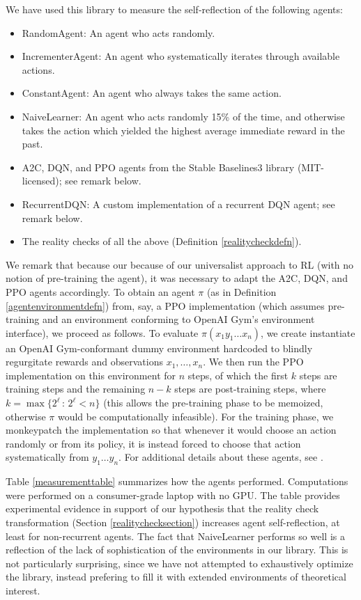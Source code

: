 \documentclass{article}
\begin{document}
We have used this library to measure the self-reflection of the following agents:
\begin{itemize}
  \item RandomAgent: An agent who acts randomly.
  \item IncrementerAgent: An agent who systematically iterates through available
    actions.
  \item ConstantAgent: An agent who always takes the same action.
  \item NaiveLearner: An agent who acts randomly 15\% of the time, and otherwise
    takes the action which yielded the highest average immediate reward in the past.
  \item A2C, DQN, and PPO agents from the Stable Baselines3 library
    \cite{stable-baselines3} (MIT-licensed); see remark below.
  \item RecurrentDQN: A custom implementation of a recurrent DQN agent; see remark below.
  \item The reality checks of all the above (Definition \ref{realitycheckdefn}).
\end{itemize}
We remark that because our because of our universalist approach to RL (with no notion of
pre-training the agent), it was necessary to adapt the A2C, DQN, and PPO agents accordingly.
To obtain an agent $\pi$ (as in Definition \ref{agentenvironmentdefn}) from,
say, a PPO implementation (which assumes pre-training and an environment conforming to
OpenAI Gym's environment interface),
we proceed as follows. To evaluate
$\pi(x_1y_1\ldots x_n)$, we create instantiate an OpenAI Gym-conformant dummy environment
hardcoded to blindly regurgitate rewards and observations $x_1,\ldots,x_n$.
We then run the PPO implementation on this environment for $n$ steps, of which the first
$k$ steps are training steps and the remaining $n-k$ steps are post-training steps,
where $k=\max\{2^\ell\,:\,2^\ell<n\}$
(this allows the pre-training phase to be memoized, otherwise $\pi$ would be
computationally infeasible). For the training phase, we monkeypatch the implementation
so that whenever it would choose an action randomly or from its policy, it is instead
forced to choose that action systematically from $y_1\ldots y_n$.
For additional details about these agents, see \cite{library}.

Table \ref{measurementtable} summarizes how the agents performed.
Computations were performed on a consumer-grade laptop with no GPU.
The table provides
experimental evidence in support of our hypothesis that the reality check transformation
(Section \ref{realitychecksection}) increases agent self-reflection, at least for
non-recurrent agents. The fact that NaiveLearner performs so well is a reflection of the
lack of sophistication of the environments in our library. This is not particularly
surprising, since we have not attempted to exhaustively optimize the library, instead
prefering to fill it with extended environments of theoretical interest.
\end{document}
